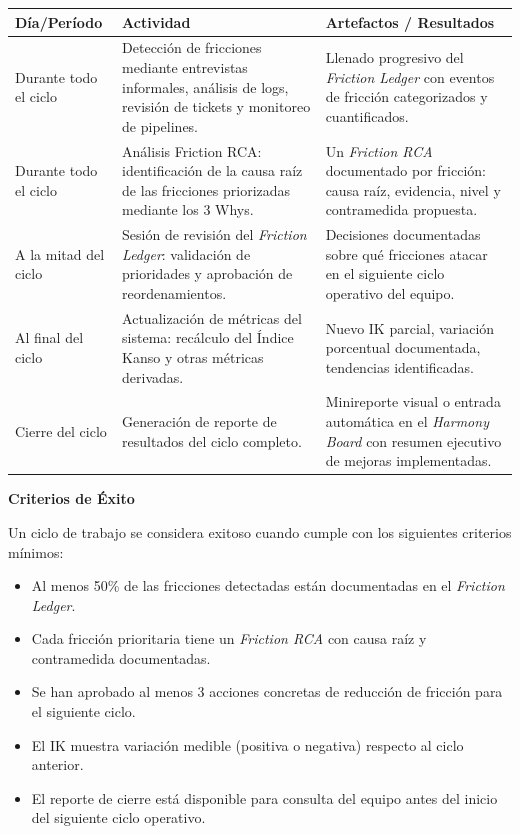\begin{center}
\small
\begin{tabular}{|p{3cm}|p{5cm}|p{5cm}|}
\hline
\textbf{Día/Período} & \textbf{Actividad} & \textbf{Artefactos / Resultados} \\ \hline
Durante todo el ciclo & Detección de fricciones mediante entrevistas informales, análisis de logs, revisión de tickets y monitoreo de pipelines. & Llenado progresivo del \textit{Friction Ledger} con eventos de fricción categorizados y cuantificados. \\ \hline
Durante todo el ciclo  & Análisis Friction RCA: identificación de la causa raíz de las fricciones priorizadas mediante los 3 Whys. & Un \textit{Friction RCA} documentado por fricción: causa raíz, evidencia, nivel y contramedida propuesta. \\ \hline
A la mitad del ciclo & Sesión de revisión del \textit{Friction Ledger}: validación de prioridades y aprobación de reordenamientos. & Decisiones documentadas sobre qué fricciones atacar en el siguiente ciclo operativo del equipo. \\ \hline
Al final del ciclo & Actualización de métricas del sistema: recálculo del Índice Kanso y otras métricas derivadas. & Nuevo IK parcial, variación porcentual documentada, tendencias identificadas. \\ \hline
Cierre del ciclo  & Generación de reporte de resultados del ciclo completo. & Minireporte visual o entrada automática en el \textit{Harmony Board} con resumen ejecutivo de mejoras implementadas. \\ \hline
\end{tabular}
\end{center}

\textbf{Criterios de Éxito}

Un ciclo de trabajo se considera exitoso cuando cumple con los siguientes criterios mínimos:

\begin{itemize}
    \item Al menos 50\% de las fricciones detectadas están documentadas en el \textit{Friction Ledger}.
    \item Cada fricción prioritaria tiene un \textit{Friction RCA} con causa raíz y contramedida documentadas.
    \item Se han aprobado al menos 3 acciones concretas de reducción de fricción para el siguiente ciclo.
    \item El IK muestra variación medible (positiva o negativa) respecto al ciclo anterior.
    \item El reporte de cierre está disponible para consulta del equipo antes del inicio del siguiente ciclo operativo.
\end{itemize}



